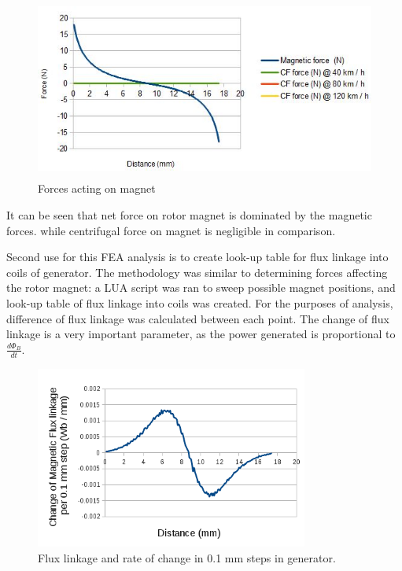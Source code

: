 \begin{figure}[htb]
\begin{center}
\includegraphics[height=6cm]{images/own_dwg/femm_fvsd_dualmagnet.jpg}
\end{center}
\caption{\label{femm_forces} Forces acting on magnet}
\end{figure}

It can be seen that net force on rotor magnet is dominated by the magnetic forces. while centrifugal force on magnet is negligible in comparison. 

Second use for this FEA analysis is to create look-up table for flux linkage into coils of generator. The methodology was similar to determining forces affecting the rotor magnet: a LUA script was ran to sweep possible magnet positions, and look-up table of flux linkage into coils was created. For the purposes of analysis, difference of flux linkage was calculated between each point. The change of flux linkage is a very important parameter, as the power generated is proportional to $\frac{d \Phi_{B}}{d t}$. 

\begin{figure}[htb]
\begin{center}
\includegraphics[height=6cm]{images/own_dwg/femm_flux_dualmagnet.jpg}
\end{center}
\caption{\label{fig:femm_linkage} Flux linkage and rate of change in 0.1 mm steps in generator.}
\end{figure}

